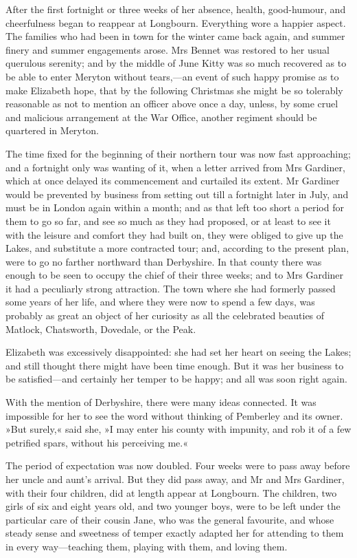 After the first fortnight or three weeks of her absence, health, good-humour, and cheerfulness began to reappear at Longbourn. Everything wore a happier aspect. The families who had been in town for the winter came back again, and summer finery and summer engagements arose. Mrs Bennet was restored to her usual querulous serenity; and by the middle of June Kitty was so much recovered as to be able to enter Meryton without tears,—an event of such happy promise as to make Elizabeth hope, that by the following Christmas she might be so tolerably reasonable as not to mention an officer above once a day, unless, by some cruel and malicious arrangement at the War Office, another regiment should be quartered in Meryton.

The time fixed for the beginning of their northern tour was now fast approaching; and a fortnight only was wanting of it, when a letter arrived from Mrs Gardiner, which at once delayed its commencement and curtailed its extent. Mr Gardiner would be prevented by business from setting out till a fortnight later in July, and must be in London again within a month; and as that left too short a period for them to go so far, and see so much as they had proposed, or at least to see it with the leisure and comfort they had built on, they were obliged to give up the Lakes, and substitute a more contracted tour; and, according to the present plan, were to go no farther northward than Derbyshire. In that county there was enough to be seen to occupy the chief of their three weeks; and to Mrs Gardiner it had a peculiarly strong attraction. The town where she had formerly passed some years of her life, and where they were now to spend a few days, was probably as great an object of her curiosity as all the celebrated beauties of Matlock, Chatsworth, Dovedale, or the Peak.

Elizabeth was excessively disappointed: she had set her heart on seeing the Lakes; and still thought there might have been time enough. But it was her business to be satisfied—and certainly her temper to be happy; and all was soon right again.

With the mention of Derbyshire, there were many ideas connected. It was impossible for her to see the word without thinking of Pemberley and its owner. »But surely,« said she, »I may enter his county with impunity, and rob it of a few petrified spars, without his perceiving me.«

The period of expectation was now doubled. Four weeks were to pass away before her uncle and aunt's arrival. But they did pass away, and Mr and Mrs Gardiner, with their four children, did at length appear at Longbourn. The children, two girls of six and eight years old, and two younger boys, were to be left under the particular care of their cousin Jane, who was the general favourite, and whose steady sense and sweetness of temper exactly adapted her for attending to them in every way—teaching them, playing with them, and loving them.

